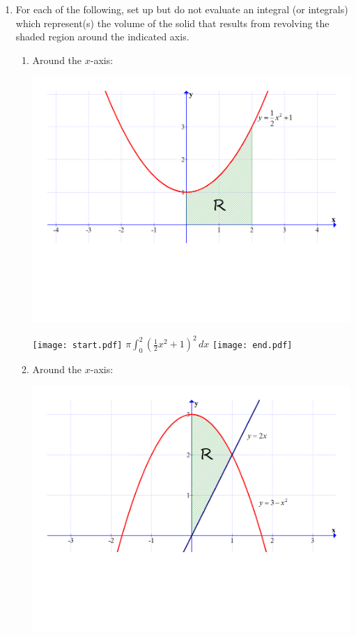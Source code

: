 \documentclass[12pt]{article}
\begin{document}
\begin{enumerate}

\item For each of the following, set up but do not evaluate an integral (or integrals) which represent(s) the volume of the solid that results from revolving the shaded region around the indicated axis.

\begin{enumerate}

\item Around the $x$-axis:

\begin{center}

\includegraphics[scale=0.5]{graph1.pdf}

\end{center}

\texttt{[image: start.pdf]}
{{$\pi\int_0^2 \left(\frac{1}{2}x^2+1\right)^2 \,dx$}}
\texttt{[image: end.pdf]}


\newpage

\item Around the $x$-axis:

\begin{center}

\includegraphics[scale=0.3]{graph2.pdf}


\end{center}
\end{enumerate}
\end{enumerate}
\end{document}
